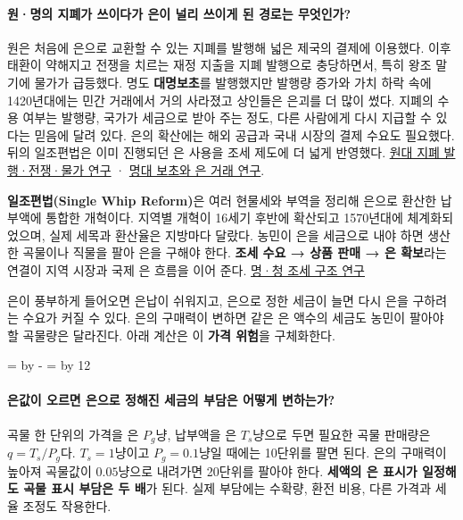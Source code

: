 \documentclass[10pt,a4paper]{article}
\newcommand{\ReserveQuestionSpace}{%
  \par\begingroup
  \dimen0=\pagegoal \advance\dimen0 by -\pagetotal
  \dimen2=\baselineskip \multiply\dimen2 by 12
  \ifdim\dimen0<\dimen2 \newpage\fi
  \endgroup}
\begin{document}
\paragraph{원·명의 지폐가 쓰이다가 은이 널리 쓰이게 된 경로는 무엇인가?}
원은 처음에 은으로 교환할 수 있는 지폐를 발행해 넓은 제국의 결제에 이용했다. 이후 태환이 약해지고 전쟁을 치르는 재정 지출을 지폐 발행으로 충당하면서, 특히 왕조 말기에 물가가 급등했다. 명도 \textbf{대명보초}를 발행했지만 발행량 증가와 가치 하락 속에 1420년대에는 민간 거래에서 거의 사라졌고 상인들은 은괴를 더 많이 썼다. 지폐의 수용 여부는 발행량, 국가가 세금으로 받아 주는 정도, 다른 사람에게 다시 지급할 수 있다는 믿음에 달려 있다. 은의 확산에는 해외 공급과 국내 시장의 결제 수요도 필요했다. 뒤의 일조편법은 이미 진행되던 은 사용을 조세 제도에 더 넓게 반영했다. \href{https://hummedia.manchester.ac.uk/schools/soss/economics/discussionpapers/EDP-2207.pdf}{원대 지폐 발행·전쟁·물가 연구} · \href{https://www.cambridge.org/core/books/abs/rise-and-demise-of-paper-money-in-imperial-china/triumph-of-the-silver-economy/F9C43A4D537537BE3829F03DB0640406}{명대 보초와 은 거래 연구}.\par

\textbf{일조편법(Single Whip Reform)}은 여러 현물세와 부역을 정리해 은으로 환산한 납부액에 통합한 개혁이다. 지역별 개혁이 16세기 후반에 확산되고 1570년대에 체계화되었으며, 실제 세목과 환산율은 지방마다 달랐다. 농민이 은을 세금으로 내야 하면 생산한 곡물이나 직물을 팔아 은을 구해야 한다. \textbf{조세 수요 → 상품 판매 → 은 확보}라는 연결이 지역 시장과 국제 은 흐름을 이어 준다. \href{https://www.cambridge.org/core/journals/journal-of-chinese-history/article/fiscal-irrationality-and-dynastic-succession-in-eighteenthcentury-china/3C88EF0F10D658B6F9E23BD58AD300FF}{명·청 조세 구조 연구}\par

은이 풍부하게 들어오면 은납이 쉬워지고, 은으로 정한 세금이 늘면 다시 은을 구하려는 수요가 커질 수 있다. 은의 구매력이 변하면 같은 은 액수의 세금도 농민이 팔아야 할 곡물량은 달라진다. 아래 계산은 이 \textbf{가격 위험}을 구체화한다.\par

\ReserveQuestionSpace
\paragraph{은값이 오르면 은으로 정해진 세금의 부담은 어떻게 변하는가?}
곡물 한 단위의 가격을 은 $P_g$냥, 납부액을 은 $T_s$냥으로 두면 필요한 곡물 판매량은 $q=T_s/P_g$다. $T_s=1$냥이고 $P_g=0.1$냥일 때에는 10단위를 팔면 된다. 은의 구매력이 높아져 곡물값이 $0.05$냥으로 내려가면 20단위를 팔아야 한다. \textbf{세액의 은 표시가 일정해도 곡물 표시 부담은 두 배}가 된다. 실제 부담에는 수확량, 환전 비용, 다른 가격과 세율 조정도 작용한다.\par
\end{document}
